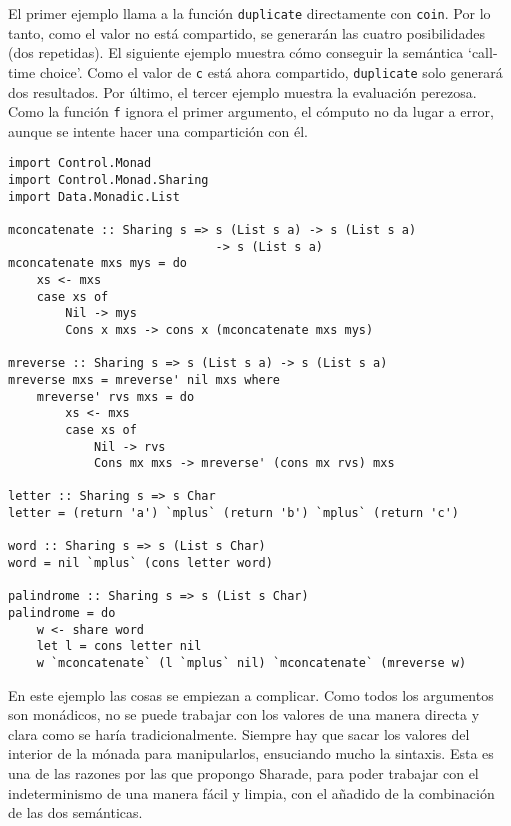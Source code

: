 \documentclass[class=article, crop=false]{standalone}
\begin{document}
El primer ejemplo llama a la función \verb`duplicate` directamente con \verb`coin`. Por lo
tanto, como el valor no está compartido, se generarán las cuatro posibilidades (dos
repetidas). El siguiente ejemplo muestra cómo conseguir la semántica `call-time choice'. Como
el valor de \verb`c` está ahora compartido, \verb`duplicate` solo generará dos resultados.
Por último, el tercer ejemplo muestra la evaluación perezosa. Como la función \verb`f` ignora
el primer argumento, el cómputo no da lugar a error, aunque se intente hacer una compartición
con él.

\begin{verbatim}
import Control.Monad
import Control.Monad.Sharing
import Data.Monadic.List

mconcatenate :: Sharing s => s (List s a) -> s (List s a)
                             -> s (List s a)
mconcatenate mxs mys = do
    xs <- mxs
    case xs of
        Nil -> mys
        Cons x mxs -> cons x (mconcatenate mxs mys)

mreverse :: Sharing s => s (List s a) -> s (List s a)
mreverse mxs = mreverse' nil mxs where
    mreverse' rvs mxs = do
        xs <- mxs
        case xs of
            Nil -> rvs
            Cons mx mxs -> mreverse' (cons mx rvs) mxs

letter :: Sharing s => s Char
letter = (return 'a') `mplus` (return 'b') `mplus` (return 'c')

word :: Sharing s => s (List s Char)
word = nil `mplus` (cons letter word)

palindrome :: Sharing s => s (List s Char)
palindrome = do
    w <- share word
    let l = cons letter nil
    w `mconcatenate` (l `mplus` nil) `mconcatenate` (mreverse w)
\end{verbatim}

En este ejemplo las cosas se empiezan a complicar. Como todos los argumentos son monádicos,
no se puede trabajar con los valores de una manera directa y clara como se haría
tradicionalmente. Siempre hay que sacar los valores del interior de la mónada para
manipularlos, ensuciando mucho la sintaxis. Esta es una de las razones por las que propongo
Sharade, para poder trabajar con el indeterminismo de una manera fácil y limpia, con el
añadido de la combinación de las dos semánticas.
\end{document}
